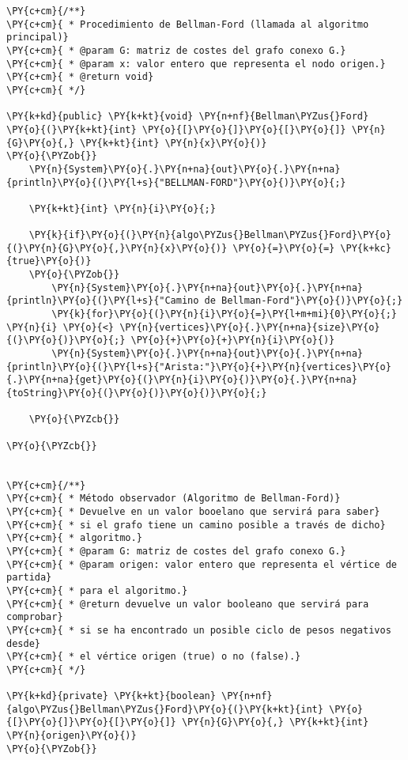 \begin{Verbatim}[commandchars=\\\{\}]
\PY{c+cm}{/**}
\PY{c+cm}{ * Procedimiento de Bellman-Ford (llamada al algoritmo principal)}
\PY{c+cm}{ * @param G: matriz de costes del grafo conexo G.}
\PY{c+cm}{ * @param x: valor entero que representa el nodo origen.}
\PY{c+cm}{ * @return void}
\PY{c+cm}{ */}

\PY{k+kd}{public} \PY{k+kt}{void} \PY{n+nf}{Bellman\PYZus{}Ford} \PY{o}{(}\PY{k+kt}{int} \PY{o}{[}\PY{o}{]}\PY{o}{[}\PY{o}{]} \PY{n}{G}\PY{o}{,} \PY{k+kt}{int} \PY{n}{x}\PY{o}{)}
\PY{o}{\PYZob{}}
    \PY{n}{System}\PY{o}{.}\PY{n+na}{out}\PY{o}{.}\PY{n+na}{println}\PY{o}{(}\PY{l+s}{"BELLMAN-FORD"}\PY{o}{)}\PY{o}{;}

    \PY{k+kt}{int} \PY{n}{i}\PY{o}{;}
	
    \PY{k}{if}\PY{o}{(}\PY{n}{algo\PYZus{}Bellman\PYZus{}Ford}\PY{o}{(}\PY{n}{G}\PY{o}{,}\PY{n}{x}\PY{o}{)} \PY{o}{=}\PY{o}{=} \PY{k+kc}{true}\PY{o}{)}
	\PY{o}{\PYZob{}}
	    \PY{n}{System}\PY{o}{.}\PY{n+na}{out}\PY{o}{.}\PY{n+na}{println}\PY{o}{(}\PY{l+s}{"Camino de Bellman-Ford"}\PY{o}{)}\PY{o}{;}
	    \PY{k}{for}\PY{o}{(}\PY{n}{i}\PY{o}{=}\PY{l+m+mi}{0}\PY{o}{;} \PY{n}{i} \PY{o}{<} \PY{n}{vertices}\PY{o}{.}\PY{n+na}{size}\PY{o}{(}\PY{o}{)}\PY{o}{;} \PY{o}{+}\PY{o}{+}\PY{n}{i}\PY{o}{)}
		\PY{n}{System}\PY{o}{.}\PY{n+na}{out}\PY{o}{.}\PY{n+na}{println}\PY{o}{(}\PY{l+s}{"Arista:"}\PY{o}{+}\PY{n}{vertices}\PY{o}{.}\PY{n+na}{get}\PY{o}{(}\PY{n}{i}\PY{o}{)}\PY{o}{.}\PY{n+na}{toString}\PY{o}{(}\PY{o}{)}\PY{o}{)}\PY{o}{;}

	\PY{o}{\PYZcb{}}
	
\PY{o}{\PYZcb{}}


\PY{c+cm}{/**}
\PY{c+cm}{ * Método observador (Algoritmo de Bellman-Ford)}
\PY{c+cm}{ * Devuelve en un valor booelano que servirá para saber}
\PY{c+cm}{ * si el grafo tiene un camino posible a través de dicho}
\PY{c+cm}{ * algoritmo.}
\PY{c+cm}{ * @param G: matriz de costes del grafo conexo G.}
\PY{c+cm}{ * @param origen: valor entero que representa el vértice de partida}
\PY{c+cm}{ * para el algoritmo.}
\PY{c+cm}{ * @return devuelve un valor booleano que servirá para comprobar}
\PY{c+cm}{ * si se ha encontrado un posible ciclo de pesos negativos desde}
\PY{c+cm}{ * el vértice origen (true) o no (false).}
\PY{c+cm}{ */}

\PY{k+kd}{private} \PY{k+kt}{boolean} \PY{n+nf}{algo\PYZus{}Bellman\PYZus{}Ford}\PY{o}{(}\PY{k+kt}{int} \PY{o}{[}\PY{o}{]}\PY{o}{[}\PY{o}{]} \PY{n}{G}\PY{o}{,} \PY{k+kt}{int} \PY{n}{origen}\PY{o}{)}
\PY{o}{\PYZob{}}


\end{Verbatim}

